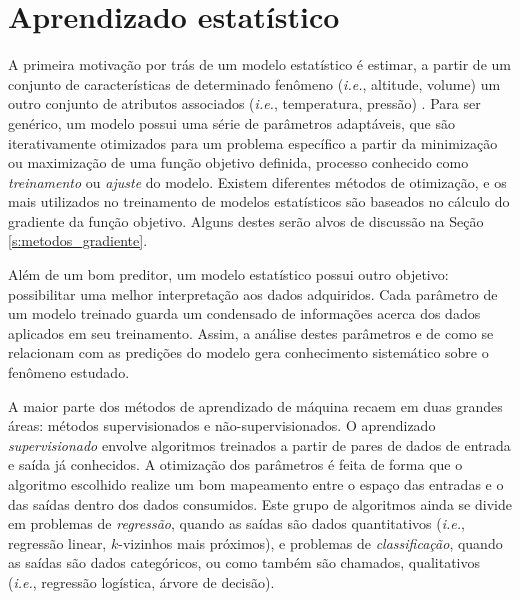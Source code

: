 
\chapter{Aprendizado estatístico}

  A primeira motivação por trás de um modelo estatístico é estimar, a partir de um conjunto de características de determinado fenômeno (\textit{i.e.}, altitude, volume) um outro conjunto de atributos associados (\textit{i.e.}, temperatura, pressão) . Para ser genérico, um modelo possui uma série de parâmetros adaptáveis, que são iterativamente otimizados para um problema específico a partir da minimização ou maximização de uma função objetivo definida, processo conhecido como \emph{treinamento} ou \emph{ajuste} do modelo. Existem diferentes métodos de otimização, e os mais utilizados no treinamento de modelos estatísticos são baseados no cálculo do gradiente da função objetivo. Alguns destes serão alvos de discussão na Seção \ref{s:metodos_gradiente}.

  Além de um bom preditor, um modelo estatístico possui outro objetivo: possibilitar uma melhor interpretação aos dados adquiridos. Cada parâmetro de um modelo treinado guarda um condensado de informações acerca dos dados aplicados em seu treinamento. Assim, a análise destes parâmetros e de como se relacionam com as predições do modelo gera conhecimento sistemático sobre o fenômeno estudado.

  A maior parte dos métodos de aprendizado de máquina recaem em duas grandes áreas: métodos supervisionados e não-supervisionados. O aprendizado \emph{supervisionado} envolve algoritmos treinados a partir de pares de dados de entrada e saída já conhecidos. A otimização dos parâmetros é feita de forma que o algoritmo escolhido realize um bom mapeamento entre o espaço das entradas e o das saídas dentro dos dados consumidos. Este grupo de algoritmos ainda se divide em problemas de \emph{regressão}, quando as saídas são dados quantitativos (\textit{i.e.}, regressão linear, $k$-vizinhos mais próximos), e problemas de \emph{classificação}, quando as saídas são dados categóricos, ou como também são chamados, qualitativos (\textit{i.e.}, regressão logística, árvore de decisão).


